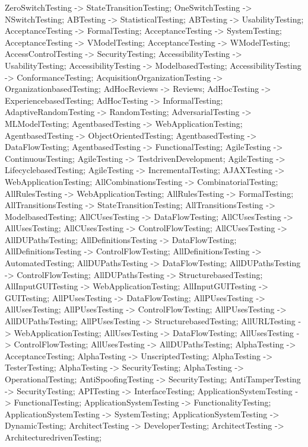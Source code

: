 \documentclass{article}
\begin{document}
{ZeroSwitchTesting -> StateTransitionTesting;
OneSwitchTesting -> NSwitchTesting;
ABTesting -> StatisticalTesting;
ABTesting -> UsabilityTesting;
AcceptanceTesting -> FormalTesting;
AcceptanceTesting -> SystemTesting;
AcceptanceTesting -> VModelTesting;
AcceptanceTesting -> WModelTesting;
AccessControlTesting -> SecurityTesting;
AccessibilityTesting -> UsabilityTesting;
AccessibilityTesting -> ModelbasedTesting;
AccessibilityTesting -> ConformanceTesting;
AcquisitionOrganizationTesting -> OrganizationbasedTesting;
AdHocReviews -> Reviews;
AdHocTesting -> ExperiencebasedTesting;
AdHocTesting -> InformalTesting;
AdaptiveRandomTesting -> RandomTesting;
AdversarialTesting -> MLModelTesting;
AgentbasedTesting -> WebApplicationTesting;
AgentbasedTesting -> ObjectOrientedTesting;
AgentbasedTesting -> DataFlowTesting;
AgentbasedTesting -> FunctionalTesting;
AgileTesting -> ContinuousTesting;
AgileTesting -> TestdrivenDevelopment;
AgileTesting -> LifecyclebasedTesting;
AgileTesting -> IncrementalTesting;
AJAXTesting -> WebApplicationTesting;
AllCombinationsTesting -> CombinatorialTesting;
AllRulesTesting -> WebApplicationTesting;
AllRulesTesting -> FormalTesting;
AllTransitionsTesting -> StateTransitionTesting;
AllTransitionsTesting -> ModelbasedTesting;
AllCUsesTesting -> DataFlowTesting;
AllCUsesTesting -> AllUsesTesting;
AllCUsesTesting -> ControlFlowTesting;
AllCUsesTesting -> AllDUPathsTesting;
AllDefinitionsTesting -> DataFlowTesting;
AllDefinitionsTesting -> ControlFlowTesting;
AllDefinitionsTesting -> AutomatedTesting;
AllDUPathsTesting -> DataFlowTesting;
AllDUPathsTesting -> ControlFlowTesting;
AllDUPathsTesting -> StructurebasedTesting;
AllInputGUITesting -> WebApplicationTesting;
AllInputGUITesting -> GUITesting;
AllPUsesTesting -> DataFlowTesting;
AllPUsesTesting -> AllUsesTesting;
AllPUsesTesting -> ControlFlowTesting;
AllPUsesTesting -> AllDUPathsTesting;
AllPUsesTesting -> StructurebasedTesting;
AllURLTesting -> WebApplicationTesting;
AllUsesTesting -> DataFlowTesting;
AllUsesTesting -> ControlFlowTesting;
AllUsesTesting -> AllDUPathsTesting;
AlphaTesting -> AcceptanceTesting;
AlphaTesting -> UnscriptedTesting;
AlphaTesting -> TesterTesting;
AlphaTesting -> SecurityTesting;
AlphaTesting -> OperationalTesting;
AntiSpoofingTesting -> SecurityTesting;
AntiTamperTesting -> SecurityTesting;
APITesting -> InterfaceTesting;
ApplicationSystemTesting -> FunctionalTesting;
ApplicationSystemTesting -> FunctionalityTesting;
ApplicationSystemTesting -> SystemTesting;
ApplicationSystemTesting -> DynamicTesting;
ArchitectTesting -> DeveloperTesting;
ArchitectTesting -> ArchitecturedrivenTesting;
}
\end{document}
